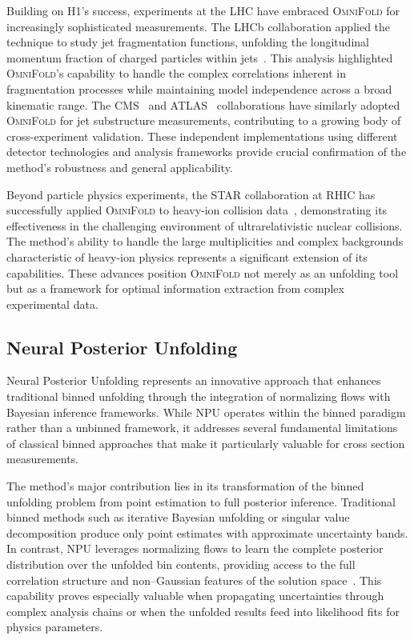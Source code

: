    Building on H1's success, experiments at the LHC have embraced \textsc{OmniFold} for increasingly sophisticated measurements.
    The LHCb collaboration applied the technique to study jet fragmentation functions, unfolding the longitudinal momentum fraction of charged particles within jets~\cite{collaboration_multidifferential_2023}.
    This analysis highlighted \textsc{OmniFold}'s capability to handle the complex correlations inherent in fragmentation processes while maintaining model independence across a broad kinematic range.
    The CMS~\cite{CMS:2025sws} and ATLAS~\cite{collaboration_measurement_2025,collaboration_simultaneous_2024,panJetSubstructureMeasurements2024} collaborations have similarly adopted \textsc{OmniFold} for jet substructure measurements, contributing to a growing body of cross-experiment validation.
    These independent implementations using different detector technologies and analysis frameworks provide crucial confirmation of the method's robustness and general applicability.
    
    Beyond particle physics experiments, the STAR collaboration at RHIC has successfully applied \textsc{OmniFold} to heavy-ion collision data~\cite{song_measurement_2023}, demonstrating its effectiveness in the challenging environment of ultrarelativistic nuclear collisions.
    The method's ability to handle the large multiplicities and complex backgrounds characteristic of heavy-ion physics represents a significant extension of its capabilities.
    These advances position \textsc{OmniFold} not merely as an unfolding tool but as a framework for optimal information extraction from complex experimental data.

\subsection{Neural Posterior Unfolding}
    Neural Posterior Unfolding represents an innovative approach that enhances traditional binned unfolding through the integration of normalizing flows with Bayesian inference frameworks.
    While NPU operates within the binned paradigm rather than a unbinned framework, it addresses several fundamental limitations of classical binned approaches that make it particularly valuable for cross section measurements.

    The method's major contribution lies in its transformation of the binned unfolding problem from point estimation to full posterior inference.
    Traditional binned methods such as iterative Bayesian unfolding or singular value decomposition produce only point estimates with approximate uncertainty bands.
    In contrast, NPU leverages normalizing flows to learn the complete posterior distribution over the unfolded bin contents, providing access to the full correlation structure and non--Gaussian features of the solution space~\cite{acosta2024npu}.
    This capability proves especially valuable when propagating uncertainties through complex analysis chains or when the unfolded results feed into likelihood fits for physics parameters.

